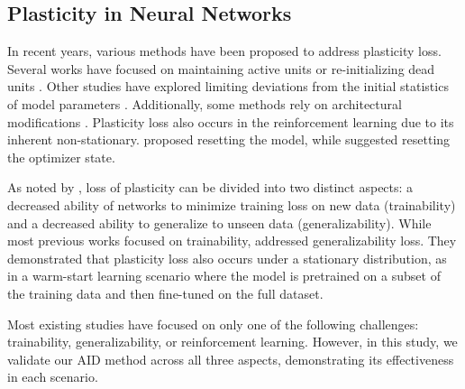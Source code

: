 

\subsection{Plasticity in Neural Networks}
In recent years, various methods have been proposed to address plasticity loss.
Several works have focused on maintaining active units \cite{abbas2023loss, elsayed2024addressing} or re-initializing dead units \cite{sokar2023dormant, dohare2024loss}.
Other studies have explored limiting deviations from the initial statistics of model parameters \cite{kumar2023maintaining, lewandowski2023curvature, elsayed2024weight}.
Additionally, some methods rely on architectural modifications \cite{nikishin2024deep, lee2024slow, lewandowski2024plastic}.  
Plasticity loss also occurs in the reinforcement learning due to its inherent non-stationary. \citet{nikishin2022primacy} proposed resetting the model, while \citet{asadi2024resetting} suggested resetting the optimizer state. 

As noted by \citet{berariu2021study}, loss of plasticity can be divided into two distinct aspects: a decreased ability of networks to minimize training loss on new data (trainability) and a decreased ability to generalize to unseen data (generalizability).
While most previous works focused on trainability, \citet{lee2024slow} addressed generalizability loss.
They demonstrated that plasticity loss also occurs under a stationary distribution, as in a warm-start learning scenario where the model is pretrained on a subset of the training data and then fine-tuned on the full dataset.

Most existing studies have focused on only one of the following challenges: trainability, generalizability, or reinforcement learning.
However, in this study, we validate our AID method across all three aspects, demonstrating its effectiveness in each scenario.




